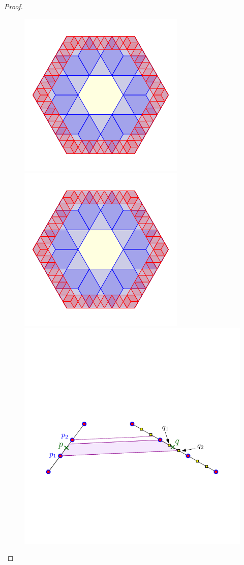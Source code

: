 \documentclass[12pt]{article}%
\begin{document}
\begin{proof}
    \begin{figure}[h]
        \phantom{}%
        \hfill%
        \includegraphics[page=2]{figs/decompose} \hfill%
        \includegraphics[page=3]{figs/decompose} \hfill%
        \includegraphics[page=1]{figs/points_trap} \hfill%

\end{figure}
\end{proof}
\end{document}
